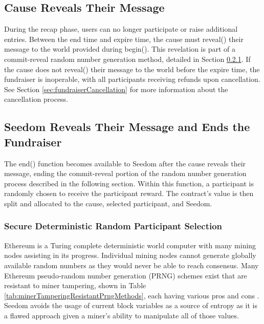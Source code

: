 \documentclass[11pt]{article}
\begin{document}
\subsection{Cause Reveals Their Message}

During the recap phase, users can no longer participate or raise additional entries. Between the end time and expire time, the cause must reveal() their message to the world provided during begin(). This revelation is part of a commit-reveal random number generation method, detailed in Section \ref{sec:secureDeterministicRandomParticipantSelection}. If the cause does not reveal() their message to the world before the expire time, the fundraiser is inoperable, with all participants receiving refunds upon cancellation. See Section \ref{sec:fundraiserCancellation} for more information about the cancellation process.

\subsection{Seedom Reveals Their Message and Ends the Fundraiser}
\label{sec:seedomRevealsTheirMessageAndEndsTheFundraiser}

The end() function becomes available to Seedom after the cause reveals their message, ending the commit-reveal portion of the random number generation process described in the following section. Within this function, a participant is randomly chosen to receive the participant reward. The contract's value is then split and allocated to the cause, selected participant, and Seedom.

\subsubsection{Secure Deterministic Random Participant Selection}
\label{sec:secureDeterministicRandomParticipantSelection}

Ethereum is a Turing complete deterministic world computer with many mining nodes assisting in its progress. Individual mining nodes cannot generate globally available random numbers as they would never be able to reach consensus. Many Ethereum pseudo-random number generation (PRNG) schemes exist that are resistant to miner tampering, shown in Table \ref{tab:minerTamperingResistantPrngMethods}, each having various pros and cons \cite{12}. Seedom avoids the usage of current block variables as a source of entropy as it is a flawed approach given a miner's ability to manipulate all of those values.
\end{document}
